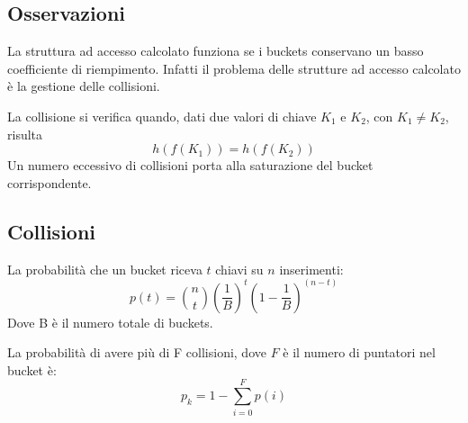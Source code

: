 \documentclass[oneside,a4paper,11pt]{book}
\theoremstyle{italicstyle}
\theoremstyle{normStyle}
\begin{document}
\subsection{Osservazioni}
La struttura ad accesso calcolato funziona se i buckets conservano un basso coefficiente 
di riempimento. Infatti il problema delle strutture ad accesso calcolato è la 
gestione delle collisioni.

La collisione si verifica quando, dati due valori di chiave $K_1$ e $K_2$, con 
$K_1 \neq K_2$, risulta
\[
  h(f(K_1)) = h(f(K_2))
\]
Un numero eccessivo di collisioni porta alla saturazione del bucket corrispondente.
\subsection{Collisioni}
La probabilità che un bucket riceva $t$ chiavi su $n$ inserimenti:
\[
  p(t) = \binom{n}{t}\left( \frac{1}{B} \right) ^t \left( 1 - \frac{1}{B}\right)^{(n-t)}
\]
Dove B è il numero totale di buckets.

La probabilità di avere più di F collisioni, dove $F$ è il numero di puntatori 
nel bucket è:
\[
  p_k = 1 - \sum_{i=0}^{F}p(i)
\]
\end{document}
